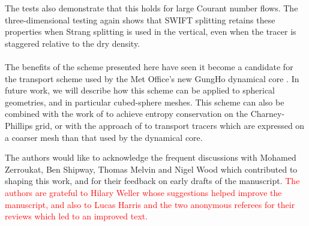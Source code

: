 \documentclass{ametsocV6.1}
\newcommand{\change}[1]{\textcolor{red}{#1}}
\begin{document}
The tests also demonstrate that this holds for large Courant number flows. The three-dimensional testing again shows that SWIFT splitting retains these properties when Strang splitting is used in the vertical, even when the tracer is staggered relative to the dry density. \\
\\
The benefits of the scheme presented here have seen it become a candidate for the transport scheme used by the Met Office's new GungHo dynamical core \citep{melvin2024mixed}.
In future work, we will describe how this scheme can be applied to spherical geometries, and in particular cubed-sphere meshes.
This scheme can also be combined with the work of \citet{thuburn2022numerical} to achieve entropy conservation on the Charney-Phillips grid, or with the approach of \citet{brown2024physics} to transport tracers which are expressed on a coarser mesh than that used by the dynamical core.

\clearpage
\acknowledgments

The authors would like to acknowledge the frequent discussions with Mohamed Zerroukat, Ben Shipway, Thomas Melvin and Nigel Wood which contributed to shaping this work, and for their feedback on early drafts of the manuscript. \change{The authors are grateful to Hilary Weller whose suggestions helped improve the manuscript, and also to Lucas Harris and the two anonymous referees for their reviews which led to an improved text.}

% 
%
\datastatement
\end{document}
